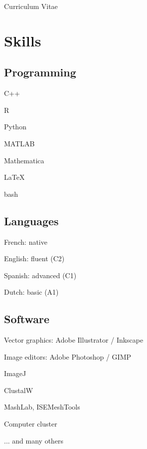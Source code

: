 \documentclass[11pt,a4paper]{article}
\begin{document}
\begin{cv}{Curriculum Vitae}
\begin{cvlist}{}
		\end{cvlist}
		
		\section{Skills}
		
		\subsection{Programming}
		
		\begin{cvlist}{}
		
			\item C++
			\item R
			\item Python
			\item MATLAB
			\item Mathematica
			\item LaTeX
			\item bash
		
		\end{cvlist}
	
		\subsection{Languages}
		
		\begin{cvlist}{}
			
			\item French: native
			\item English: fluent (C2)
			\item Spanish: advanced (C1)
			\item Dutch: basic (A1)
			
		\end{cvlist}
	
		\subsection{Software}
		
		\begin{cvlist}{}
			
			\item Vector graphics: Adobe Illustrator / Inkscape
			\item Image editors: Adobe Photoshop / GIMP
			\item ImageJ
			\item ClustalW
			\item MashLab, ISEMeshTools
			\item Computer cluster
			\item ... and many others
			

\end{cvlist}
\end{cv}
\end{document}
